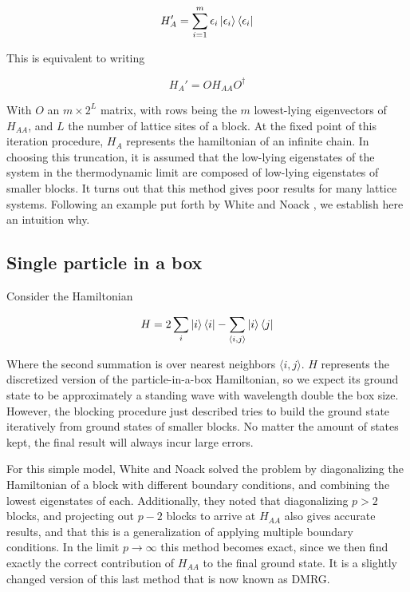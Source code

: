 \begin{equation}
  H_{A}' = \sum_{i = 1}^{m} \epsilon_{i} \ket{\epsilon_{i}}\bra{\epsilon_{i}}
 \end{equation}

This is equivalent to writing

\begin{equation}
  H_{A}' = O H_{AA} O^{\dagger}
\end{equation}

With $O$ an $m \times 2^L$ matrix, with rows being the $m$ lowest-lying
eigenvectors of $H_{AA}$, and $L$ the number of lattice sites of a block. At
the fixed point of this iteration procedure, $H_A$ represents the
hamiltonian of an infinite chain.  In choosing this truncation, it is assumed that the
low-lying eigenstates of the system in the thermodynamic limit are
composed of low-lying eigenstates of smaller blocks. It turns out that
this method gives poor results for many lattice systems. Following an
example put forth by White and Noack \cite{white1992real}, we establish
here an intuition why.

\subsection{Single particle in a box}

Consider the Hamiltonian

\begin{equation} 
  H = 2 \sum_i \ket{i}\bra{i} - \sum_{\langle i, j \rangle} \ket{i}\bra{j}
\end{equation}

Where the second summation is over nearest neighbors $\langle i,
j \rangle$. $H$ represents the discretized version of the
particle-in-a-box Hamiltonian, so we expect its ground state to be
approximately a standing wave with wavelength double the box size.
However, the blocking procedure just described tries to build the ground
state iteratively from ground states of smaller blocks. No matter the
amount of states kept, the final result will always incur large errors.

For this simple model, White and Noack solved the problem by diagonalizing
the Hamiltonian of a block with different boundary conditions, and
combining the lowest eigenstates of each. Additionally, they noted that
diagonalizing $p > 2$ blocks, and projecting out $p - 2$ blocks to arrive
at $H_{AA}$ also gives accurate results, and that this is a generalization
of applying multiple boundary conditions. In the limit $p \to \infty$
this method becomes exact, since we then find exactly the correct
contribution of $H_{AA}$ to the final ground state. It is a slightly
changed version of this last method that is now known as DMRG.



